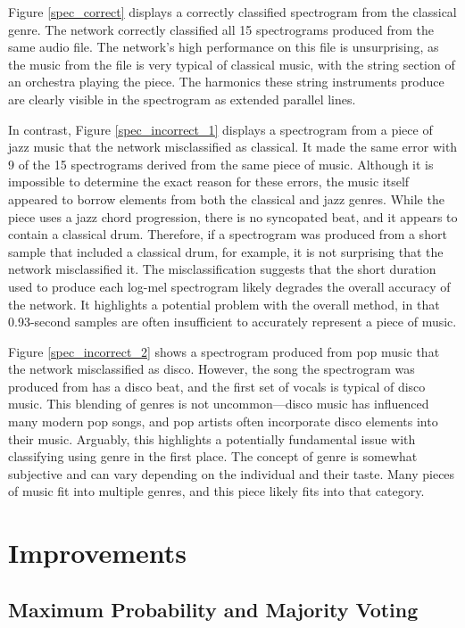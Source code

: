 \documentclass[conference]{IEEEtran}
\begin{document}
Figure \ref{spec_correct} displays a correctly classified spectrogram from the classical genre.
The network correctly classified all 15 spectrograms produced from the same audio file.
The network's high performance on this file is unsurprising, as the music from the file is very typical of classical music, with the string section of an orchestra playing the piece.
The harmonics these string instruments produce are clearly visible in the spectrogram as extended parallel lines.

In contrast, Figure \ref{spec_incorrect_1} displays a spectrogram from a piece of jazz music that the network misclassified as classical.
It made the same error with 9 of the 15 spectrograms derived from the same piece of music.
Although it is impossible to determine the exact reason for these errors, the music itself appeared to borrow elements from both the classical and jazz genres.
While the piece uses a jazz chord progression, there is no syncopated beat, and it appears to contain a classical drum.
Therefore, if a spectrogram was produced from a short sample that included a classical drum, for example, it is not surprising that the network misclassified it.
The misclassification suggests that the short duration used to produce each log-mel spectrogram likely degrades the overall accuracy of the network.
It highlights a potential problem with the overall method, in that 0.93-second samples are often insufficient to accurately represent a piece of music.

Figure \ref{spec_incorrect_2} shows a spectrogram produced from pop music that the network misclassified as disco.
However, the song the spectrogram was produced from has a disco beat, and the first set of vocals is typical of disco music.
This blending of genres is not uncommon---disco music has influenced many modern pop songs, and pop artists often incorporate disco elements into their music.
Arguably, this highlights a potentially fundamental issue with classifying using genre in the first place.
The concept of genre is somewhat subjective and can vary depending on the individual and their taste.
Many pieces of music fit into multiple genres, and this piece likely fits into that category.

\section{Improvements}

\subsection{Maximum Probability and Majority Voting}
\end{document}
